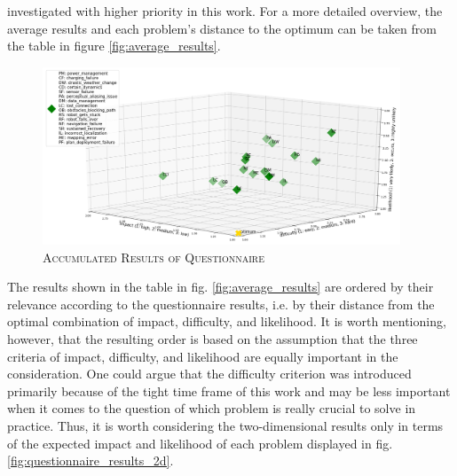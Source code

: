\documentclass[english, master, utf8]{base/thesis_KBS}
\begin{document}
investigated with higher priority in this work. For a more detailed overview, the average results and each problem's distance to the optimum can be taken from the table 
in figure \ref{fig:average_results}.
\begin{figure}[H]
    \centering
    \includegraphics[width=0.95\textwidth]{pics/questionnaire.png}
    \caption{\textsc{Accumulated Results of Questionnaire}}
    \label{fig:questionnaire_results}
\end{figure}
\noindent
The results shown in the table in fig. \ref{fig:average_results} are ordered by their relevance according to the questionnaire results, i.e.
by their distance from the optimal combination of impact, difficulty, and likelihood. It is worth mentioning, however, that the resulting order is based on the assumption
that the three criteria of impact, difficulty, and likelihood are equally important in the consideration. One could argue that the difficulty criterion was introduced 
primarily because of the tight time frame of this work and may be less important when it comes to the question of which problem is really crucial to solve in practice.
Thus, it is worth considering the two-dimensional results only in terms of the expected impact and likelihood of each problem displayed in fig. \ref{fig:questionnaire_results_2d}.
\end{document}

